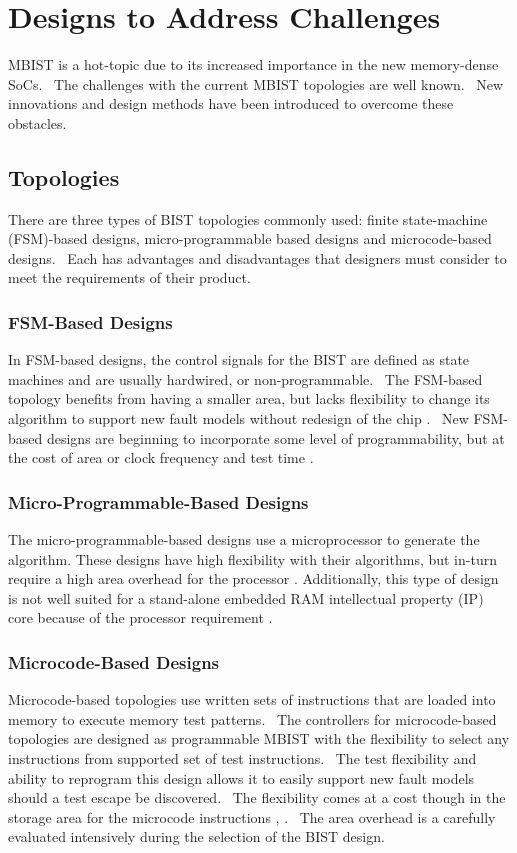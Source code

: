 \section{Designs to Address Challenges}
\label{sect:bg-designs}
MBIST is a hot-topic due to its increased importance in the new memory-dense SoCs.  The challenges with the current MBIST topologies are well known.  New innovations and design methods have been introduced to overcome these obstacles.

\subsection{Topologies}
There are three types of BIST topologies commonly used: finite state-machine (FSM)-based designs, micro-programmable based designs and microcode-based designs.  Each has advantages and disadvantages that designers must consider to meet the requirements of their product. 

\subsubsection{FSM-Based Designs}
In FSM-based designs, the control signals for the BIST are defined as state machines and are usually hardwired, or non-programmable.  The FSM-based topology benefits from having a smaller area, but lacks flexibility to change its algorithm to support new fault models without redesign of the chip \cite{5692281}.  New FSM-based designs are beginning to incorporate some level of programmability, but at the cost of area \cite{4815717} or clock frequency and test time \cite{748806}.

\subsubsection{Micro-Programmable-Based Designs}
The micro-programmable-based designs use a microprocessor to generate the algorithm.  These designs have high flexibility with their algorithms, but in-turn require a high area overhead for the processor \cite{726568}.  Additionally, this type of design is not well suited for a stand-alone embedded RAM intellectual property (IP) core because of the processor requirement \cite{1584083}.

\subsubsection{Microcode-Based Designs}
Microcode-based topologies use written sets of instructions that are loaded into memory to execute memory test patterns.  The controllers for microcode-based topologies are designed as programmable MBIST with the flexibility to select any instructions from supported set of test instructions.  The test flexibility and ability to reprogram this design allows it to easily support new fault models should a test escape be discovered.  The flexibility comes at a cost though in the storage area for the microcode instructions \cite{5692281}, \cite{114099}.  The area overhead is a carefully evaluated intensively during the selection of the BIST design. 

